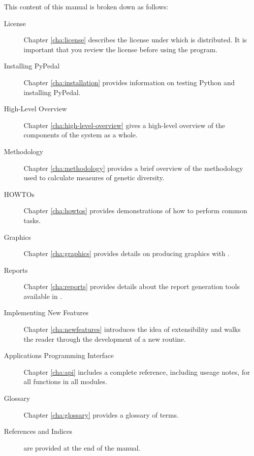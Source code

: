 This content of this manual is broken down as follows:
\begin{description}
\item[License] Chapter \ref{cha:license} describes the license under which \PyPedal{} is distributed.  It is important that you review the license before using the program.
\item[Installing PyPedal] Chapter \ref{cha:installation} provides information
   on testing Python and installing PyPedal.
\item[High-Level Overview] Chapter \ref{cha:high-level-overview} gives a
   high-level overview of the components of the \PyPedal{} system as a whole.
\item[Methodology] Chapter \ref{cha:methodology} provides a brief overview of the methodology used to calculate measures of genetic diversity.
\item[HOWTOs] Chapter \ref{cha:howtos} provides demonstrations of how to perform common tasks.
\item[Graphics] Chapter \ref{cha:graphics} provides details on producing graphics with \PyPedal{}.
\item[Reports] Chapter \ref{cha:reports} provides details about the report generation tools available in \PyPedal{}.
\item[Implementing New Features] Chapter \ref{cha:newfeatures} introduces the idea of extensibility and walks the reader through the development of a new \PyPedal{} routine.
\item[Applications Programming Interface] Chapter \ref{cha:api} includes a complete reference, including useage notes, for all functions in all \PyPedal{} modules.
\item[Glossary] Chapter \ref{cha:glossary} provides a glossary of terms.
\item[References and Indices] are provided at the end of the manual.
\end{description}

